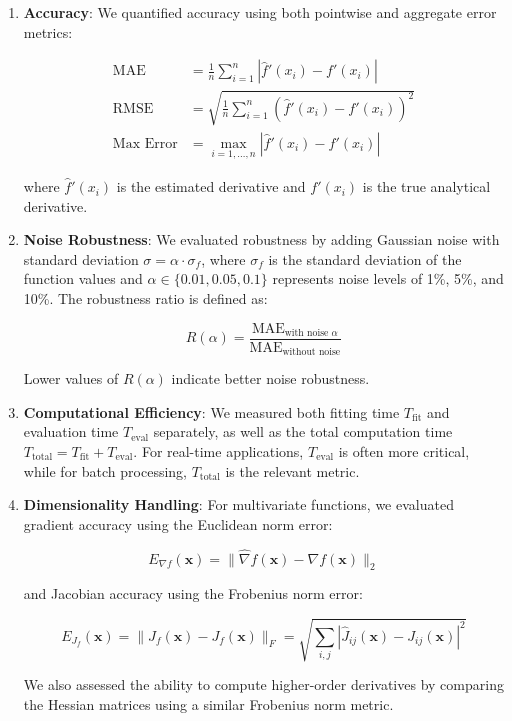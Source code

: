 \documentclass[10pt,journal,compsoc]{IEEEtran}
\begin{document}
\begin{enumerate}
    \item \textbf{Accuracy}: We quantified accuracy using both pointwise and aggregate error metrics:
    
    \begin{align}
        \text{MAE} &= \frac{1}{n}\sum_{i=1}^{n}|\hat{f}'(x_i) - f'(x_i)| \\[5pt]
        \text{RMSE} &= \sqrt{\frac{1}{n}\sum_{i=1}^{n}(\hat{f}'(x_i) - f'(x_i))^2} \\[5pt]
        \text{Max Error} &= \max_{i=1,\ldots,n}|\hat{f}'(x_i) - f'(x_i)|
    \end{align}
    
    where $\hat{f}'(x_i)$ is the estimated derivative and $f'(x_i)$ is the true analytical derivative.
    
    \item \textbf{Noise Robustness}: We evaluated robustness by adding Gaussian noise with standard deviation $\sigma = \alpha \cdot \sigma_f$, where $\sigma_f$ is the standard deviation of the function values and $\alpha \in \{0.01, 0.05, 0.1\}$ represents noise levels of 1\%, 5\%, and 10\%. The robustness ratio is defined as:
    
    \begin{equation}
        R(\alpha) = \frac{\text{MAE}_{\text{with noise } \alpha}}{\text{MAE}_{\text{without noise}}}
    \end{equation}
    
    Lower values of $R(\alpha)$ indicate better noise robustness.
    
    \item \textbf{Computational Efficiency}: We measured both fitting time $T_{\text{fit}}$ and evaluation time $T_{\text{eval}}$ separately, as well as the total computation time $T_{\text{total}} = T_{\text{fit}} + T_{\text{eval}}$. For real-time applications, $T_{\text{eval}}$ is often more critical, while for batch processing, $T_{\text{total}}$ is the relevant metric.
    
    \item \textbf{Dimensionality Handling}: For multivariate functions, we evaluated gradient accuracy using the Euclidean norm error:
    
    \begin{equation}
        E_{\nabla f}(\mathbf{x}) = \|\hat{\nabla}f(\mathbf{x}) - \nabla f(\mathbf{x})\|_2
    \end{equation}
    
    and Jacobian accuracy using the Frobenius norm error:
    
    \begin{equation}
        E_{J_f}(\mathbf{x}) = \|\hat{J}_f(\mathbf{x}) - J_f(\mathbf{x})\|_F = \sqrt{\sum_{i,j}|\hat{J}_{ij}(\mathbf{x}) - J_{ij}(\mathbf{x})|^2}
    \end{equation}
    
    We also assessed the ability to compute higher-order derivatives by comparing the Hessian matrices using a similar Frobenius norm metric.
\end{enumerate}
\end{document}

